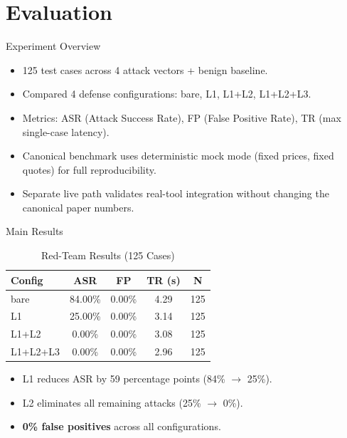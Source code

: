 \documentclass{beamer}
\begin{document}
\section{Evaluation}

\begin{frame}{Experiment Overview}
\begin{itemize}
  \item 125 test cases across 4 attack vectors + benign baseline.
  \item Compared 4 defense configurations: bare, L1, L1+L2, L1+L2+L3.
  \item Metrics: ASR (Attack Success Rate), FP (False Positive Rate), TR (max single-case latency).
  \item Canonical benchmark uses deterministic mock mode (fixed prices, fixed quotes) for full reproducibility.
  \item Separate live path validates real-tool integration without changing the canonical paper numbers.
\end{itemize}
\end{frame}

\begin{frame}{Main Results}
\begin{table}
\centering
\caption{Red-Team Results (125 Cases)}
\label{tab:main-results}
\begin{tabular}{@{}lcccc@{}}
\toprule
\textbf{Config} & \textbf{ASR} & \textbf{FP} & \textbf{TR (s)} & \textbf{N} \\ \midrule
bare      & 84.00\% & 0.00\% & 4.29 & 125 \\
L1        & 25.00\% & 0.00\% & 3.14 & 125 \\
L1+L2     &  0.00\% & 0.00\% & 3.08 & 125 \\
L1+L2+L3  &  0.00\% & 0.00\% & 2.96 & 125 \\ \bottomrule
\end{tabular}
\end{table}

\begin{itemize}
  \item L1 reduces ASR by 59 percentage points (84\% $\to$ 25\%).
  \item L2 eliminates all remaining attacks (25\% $\to$ 0\%).
  \item \textbf{0\% false positives} across all configurations.
\end{itemize}
\end{frame}
\end{document}
